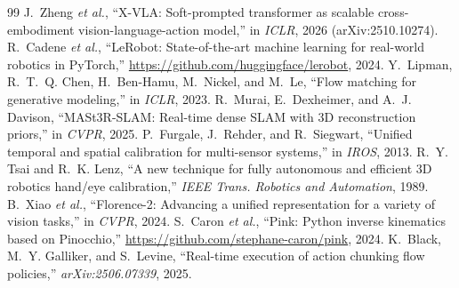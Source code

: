 \documentclass[conference,10pt]{IEEEtran}
\begin{document}
\begin{thebibliography}{99}
 J.~Zheng \emph{et al.}, ``X-VLA: Soft-prompted transformer as scalable cross-embodiment vision-language-action model,'' in \emph{ICLR}, 2026 (arXiv:2510.10274).
 R.~Cadene \emph{et al.}, ``LeRobot: State-of-the-art machine learning for real-world robotics in PyTorch,'' \url{https://github.com/huggingface/lerobot}, 2024.
 Y.~Lipman, R.~T.~Q. Chen, H.~Ben-Hamu, M.~Nickel, and M.~Le, ``Flow matching for generative modeling,'' in \emph{ICLR}, 2023.
 R.~Murai, E.~Dexheimer, and A.~J. Davison, ``MASt3R-SLAM: Real-time dense SLAM with 3D reconstruction priors,'' in \emph{CVPR}, 2025.
 P.~Furgale, J.~Rehder, and R.~Siegwart, ``Unified temporal and spatial calibration for multi-sensor systems,'' in \emph{IROS}, 2013.
 R.~Y. Tsai and R.~K. Lenz, ``A new technique for fully autonomous and efficient 3D robotics hand/eye calibration,'' \emph{IEEE Trans. Robotics and Automation}, 1989.
 B.~Xiao \emph{et al.}, ``Florence-2: Advancing a unified representation for a variety of vision tasks,'' in \emph{CVPR}, 2024.
 S.~Caron \emph{et al.}, ``Pink: Python inverse kinematics based on Pinocchio,'' \url{https://github.com/stephane-caron/pink}, 2024.
 K.~Black, M.~Y. Galliker, and S.~Levine, ``Real-time execution of action chunking flow policies,'' \emph{arXiv:2506.07339}, 2025.
\end{thebibliography}
\end{document}
